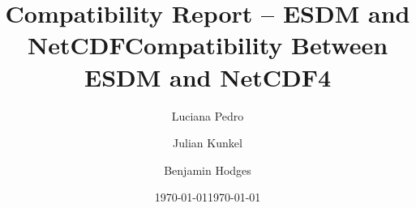 \documentclass[a4paper,12pt]{esiwace-modified}
\title{Compatibility Report -- ESDM and NetCDF}
\author{
Luciana Pedro
\and Julian Kunkel
\and Benjamin Hodges
}
\date{\today} %
\begin{document}
\title{Compatibility Between ESDM and NetCDF4}
\date{\today}

\maketitle

\tableofcontents

\parskip 9pt


\newpage



\clearpage



\clearpage



\clearpage







\clearpage



\clearpage



\clearpage



\clearpage



\clearpage



% 

% 

\end{document}
